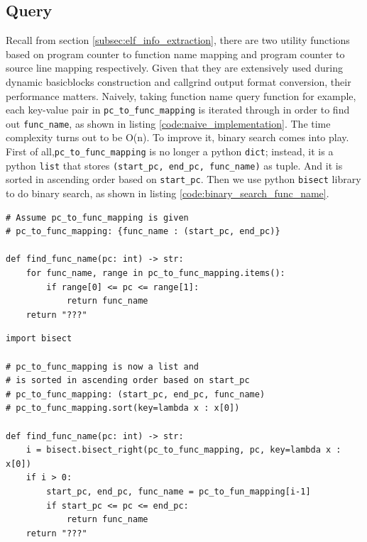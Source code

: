 \subsection{Query}
Recall from section \ref{subsec:elf_info_extraction}, there are two utility functions based on program counter to function name mapping and program counter to source line mapping respectively. Given that they are extensively used during dynamic basicblocks construction and callgrind output format conversion, their performance matters. Naively, taking function name query function for example, each key-value pair in \texttt{pc\_to\_func\_mapping} is iterated through in order to find out \texttt{func\_name}, as shown in listing \ref{code:naive_implementation}. The time complexity turns out to be O(n). To improve it, binary search comes into play. First of all,\texttt{pc\_to\_func\_mapping} is no longer a python \texttt{dict}; instead, it is a python \texttt{list} that stores \texttt{(start\_pc, end\_pc, func\_name)} as tuple. And it is sorted in ascending order based on \texttt{start\_pc}. Then we use python \texttt{bisect} library to do binary search, as shown in listing \ref{code:binary_search_func_name}. 

\medskip
\begin{center}
\begin{minipage}{\textwidth}
\begin{lstlisting}
# Assume pc_to_func_mapping is given
# pc_to_func_mapping: {func_name : (start_pc, end_pc)}

def find_func_name(pc: int) -> str:
    for func_name, range in pc_to_func_mapping.items():
        if range[0] <= pc <= range[1]:
            return func_name
    return "???"

\end{lstlisting}
\end{minipage}
\end{center}

\begin{center}
\begin{minipage}{\textwidth}
\begin{lstlisting}
import bisect

# pc_to_func_mapping is now a list and
# is sorted in ascending order based on start_pc
# pc_to_func_mapping: (start_pc, end_pc, func_name) 
# pc_to_func_mapping.sort(key=lambda x : x[0])

def find_func_name(pc: int) -> str:
    i = bisect.bisect_right(pc_to_func_mapping, pc, key=lambda x : x[0])
    if i > 0:
        start_pc, end_pc, func_name = pc_to_fun_mapping[i-1]
        if start_pc <= pc <= end_pc:
            return func_name
    return "???"
    
\end{lstlisting}
\end{minipage}
\end{center}

